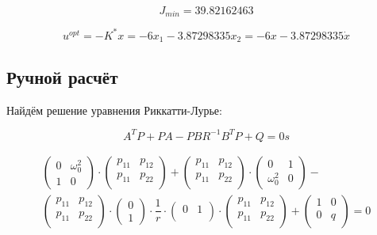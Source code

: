\documentclass[12pt]{article}
\begin{document}
\begin{equation}
J_{min} = 39.82162463 
\end{equation}

\begin{equation}
 u^{opt} = -K^*x = -6x_1 - 3.87298335x_2 = -6x - 3.87298335\dot x
\end{equation}

\subsection{Ручной расчёт}

Найдём решение уравнения Риккатти-Лурье:

\begin{equation}
 A^TP + PA - PBR^{-1}B^TP + Q = 0s
\end{equation}

\begin{eqnarray}
  \begin{pmatrix}
   0 & \omega_0^2 \\
   1 & 0
  \end{pmatrix}
  \cdot
  \begin{pmatrix}
    p_{11} & p_{12} \\
    p_{11} & p_{22} \\
  \end{pmatrix}
  + 
  \begin{pmatrix}
    p_{11} & p_{12} \\
    p_{11} & p_{22} \\
  \end{pmatrix}
  \cdot
  \begin{pmatrix}
   0 & 1 \\
   \omega_0^2 & 0
  \end{pmatrix}
  - \nonumber \\
  \begin{pmatrix}
    p_{11} & p_{12} \\
    p_{11} & p_{22} \\
  \end{pmatrix}
  \cdot
  \begin{pmatrix}
    0 \\ 1
  \end{pmatrix}
  \cdot \dfrac{1}{r}
  \cdot 
  \begin{pmatrix}
    0 & 1 \\
  \end{pmatrix}
  \cdot
  \begin{pmatrix}
    p_{11} & p_{12} \\
    p_{11} & p_{22} \\
  \end{pmatrix}
  +  
  \begin{pmatrix}
    1 & 0 \\
    0 & q \\
  \end{pmatrix}
  = 0
\end{eqnarray}
\end{document}

